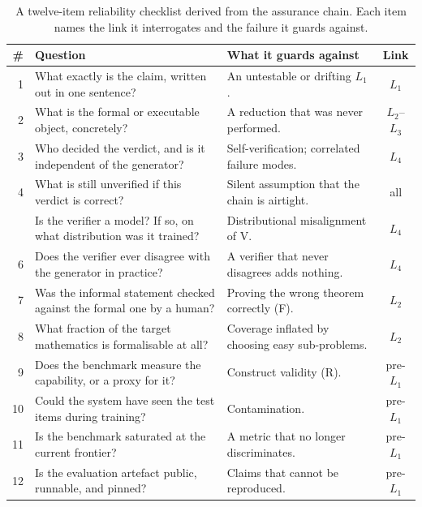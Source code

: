 \documentclass[11pt,a4paper]{article}
\newcommand{\paradigmV}{\textsf{V}}
\newcommand{\paradigmF}{\textsf{F}}
\newcommand{\paradigmR}{\textsf{R}}
\begin{document}
\begin{table}[t]
\centering
\caption{A twelve-item reliability checklist derived from the assurance chain.
Each item names the link it interrogates and the failure it guards against.}
\label{tab:checklist}
\small
\begin{tabularx}{\textwidth}{@{}r >{\raggedright\arraybackslash}p{5.3cm} >{\raggedright\arraybackslash}X c@{}}
\toprule
\textbf{\#} & \textbf{Question} & \textbf{What it guards against} & \textbf{Link} \\
\midrule
1 & What exactly is the claim, written out in one sentence? &
An untestable or drifting $L_1$. & $L_1$ \\
2 & What is the formal or executable object, concretely? &
A reduction that was never performed. & $L_2$--$L_3$ \\
3 & Who decided the verdict, and is it independent of the generator? &
Self-verification; correlated failure modes. & $L_4$ \\
4 & What is still unverified if this verdict is correct? &
Silent assumption that the chain is airtight. & all \\
\addlinespace
5 & Is the verifier a model? If so, on what distribution was it trained? &
Distributional misalignment of \paradigmV{}. & $L_4$ \\
6 & Does the verifier ever disagree with the generator in practice? &
A verifier that never disagrees adds nothing. & $L_4$ \\
7 & Was the informal statement checked against the formal one by a human? &
Proving the wrong theorem correctly (\paradigmF{}). & $L_2$ \\
8 & What fraction of the target mathematics is formalisable at all? &
Coverage inflated by choosing easy sub-problems. & $L_2$ \\
9 & Does the benchmark measure the capability, or a proxy for it? &
Construct validity (\paradigmR{}). & pre-$L_1$ \\
10 & Could the system have seen the test items during training? &
Contamination. & pre-$L_1$ \\
11 & Is the benchmark saturated at the current frontier? &
A metric that no longer discriminates. & pre-$L_1$ \\
12 & Is the evaluation artefact public, runnable, and pinned? &
Claims that cannot be reproduced. & pre-$L_1$ \\
\bottomrule
\end{tabularx}
\end{table}
\end{document}
